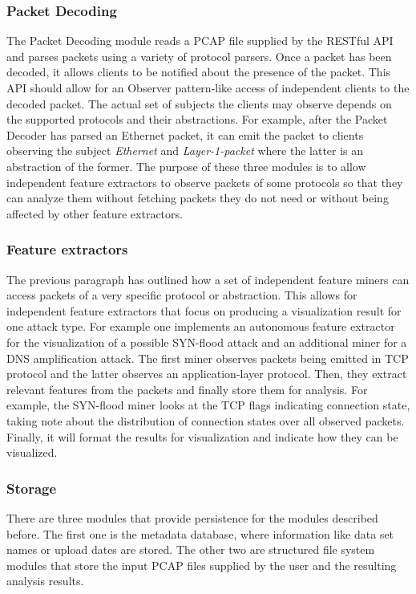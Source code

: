\subsubsection{Packet Decoding}
The Packet Decoding module reads a PCAP file supplied by the RESTful API and parses packets using a variety of protocol parsers. Once a packet has been decoded, it allows clients to be notified about the presence of the packet. This API should allow for an Observer pattern-like access of independent clients to the decoded packet. The actual set of subjects the clients may observe depends on the supported protocols and their abstractions. For example, after the Packet Decoder has parsed an Ethernet packet, it can emit the packet to clients observing the subject \textit{Ethernet} and \textit{Layer-1-packet} where the latter is an abstraction of the former. The purpose of these three modules is to allow independent feature extractors to observe packets of some protocols so that they can analyze them without fetching packets they do not need or without being affected by other feature extractors.

\subsubsection{Feature extractors}
The previous paragraph has outlined how a set of independent feature miners can access packets of a very specific protocol or abstraction. This allows for independent feature extractors that focus on producing a visualization result for one attack type. For example one implements an autonomous feature extractor for the visualization of a possible SYN-flood attack and an additional miner for a DNS amplification attack. The first miner observes packets being emitted in TCP protocol and the latter observes an application-layer protocol. Then, they extract relevant features from the packets and finally store them for analysis. For example, the SYN-flood miner looks at the TCP flags indicating connection state, taking note about the distribution of connection states over all observed packets. Finally, it will format the results for visualization and indicate how they can be visualized.

\subsubsection{Storage}
There are three modules that provide persistence for the modules described before. The first one is the metadata database, where information like data set names or upload dates are stored. The other two are structured file system modules that store the input PCAP files supplied by the user and the resulting analysis results.

